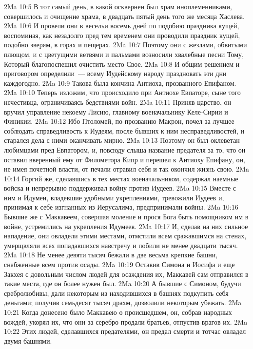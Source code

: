 \vs 2Ma 10:5 В тот самый день, в какой осквернен был храм иноплеменниками, совершилось и очищение храма, в двадцать пятый день того же месяца Хаслева.
\vs 2Ma 10:6 И провели они в весельи восемь дней по подобию праздника кущей, воспоминая, как незадолго пред тем временем они проводили праздник кущей, подобно зверям, в горах и пещерах.
\vs 2Ma 10:7 Поэтому они с жезлами, обвитыми плющом, и с цветущими ветвями и пальмами возносили хвалебные песни Тому, Который благопоспешил очистить место Свое.
\vs 2Ma 10:8 И общим решением и приговором определили~--- всему Иудейскому народу праздновать эти дни каждогодно.
\vs 2Ma 10:9 Такова была кончина Антиоха, прозванного Епифаном.
\rsbpar\vs 2Ma 10:10 Теперь изложим, что происходило при Антиохе Евпаторе, сыне того нечестивца, ограничиваясь бедствиями войн.
\vs 2Ma 10:11 Приняв царство, он вручил управление некоему Лисию, главному военачальнику Келе-Сирии и Финикии.
\vs 2Ma 10:12 Ибо Птоломей, по прозванию Макрон, почел за лучшее соблюдать справедливость к Иудеям, после бывших к ним несправедливостей, и старался дела с ними оканчивать мирно.
\vs 2Ma 10:13 Поэтому он был оклеветан любимцами пред Евпатором, и, повсюду слыша название предателя за то, что он оставил вверенный ему от Филометора Кипр и перешел к Антиоху Епифану, он, не имея почетной власти, от печали отравил себя и так окончил жизнь свою.
\rsbpar\vs 2Ma 10:14 Горгий же, сделавшись в тех местах военачальником, содержал наемные войска и непрерывно поддерживал войну против Иудеев.
\vs 2Ma 10:15 Вместе с ним и Идумеи, владевшие удобными укреплениями, тревожили Иудеев и, принимая к себе изгнанных из Иерусалима, предпринимали войны.
\vs 2Ma 10:16 Бывшие же с Маккавеем, совершая моление и прося Бога быть помощником им в войне, устремились на укрепления Идумеев.
\vs 2Ma 10:17 И, сделав на них сильное нападение, они овладели этими местами, отмстили всем сражавшимся на стенах, умерщвляли всех попадавшихся навстречу и побили не менее двадцати тысяч.
\vs 2Ma 10:18 Не менее девяти тысяч бежали в две весьма крепкие башни, снабженные всем против осады.
\vs 2Ma 10:19 Оставив Симона и Иосифа и еще Закхея с довольным числом людей для осаждения их, Маккавей сам отправился в такие места, где он более нужен был.
\vs 2Ma 10:20 А бывшие с Симоном, будучи сребролюбивы, дали некоторым из находившихся в башнях подкупить себя деньгами; получив семьдесят тысяч драхм, дозволили некоторым убежать.
\vs 2Ma 10:21 Когда донесено было Маккавею о происшедшем, он, собрав народных вождей, укорял их, что они за серебро продали братьев, отпустив врагов их.
\vs 2Ma 10:22 Этих людей, сделавшихся предателями, он предал смерти и тотчас овладел двумя башнями.
